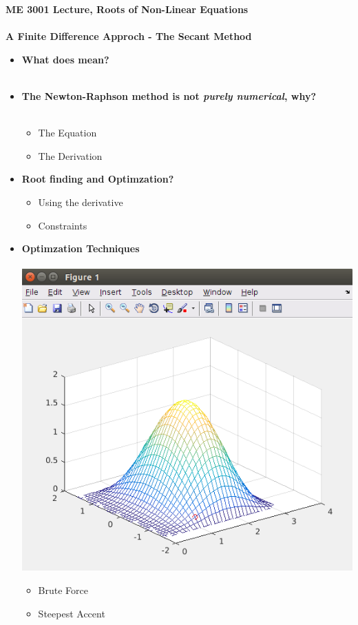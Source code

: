 \documentclass[11pt]{article}
\newcommand{\PR}{\color{mypurple}}
\begin{document}
\textbf{ \LARGE ME 3001 Lecture, Roots of Non-Linear Equations} \\\\
\textbf{ \LARGE A Finite Difference Approch - The Secant Method } \\

\begin{itemize}
\Large
	\item \textbf{What does \PR{secant} mean?} \\\\
	\item \textbf{The Newton-Raphson method is not {\it purely numerical}, why?} \\\\
		\begin{itemize}
			\item  The Equation\vspace{30mm}	\\
			\item  The Derivation\vspace{30mm}	\\
		\end{itemize}
		\newpage
		
	\item \textbf{\LARGE Root finding and Optimzation?}
		\begin{itemize}
			\item Using the derivative \vspace{80mm}	
			\item Constraints	
		\end{itemize}
		\newpage

	\item \textbf{\LARGE Optimzation Techniques}\\\\
		\includegraphics[scale=1]{lecture4_fig1.png}
		\begin{itemize}
			\item Brute Force \vspace{30mm}
			\item Steepest Accent	
		\end{itemize}
		\newpage


\end{itemize}
\end{document}
